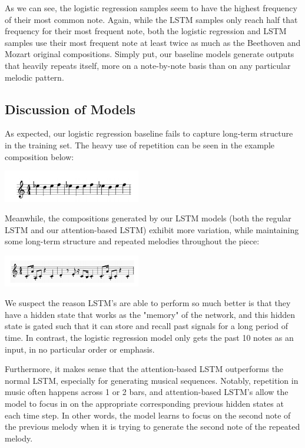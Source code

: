 \documentclass[twoside,twocolumn]{article}
\begin{document}
As we can see, the logistic regression samples seem to have the highest frequency of their most common note. Again, while the LSTM samples only reach half that frequency for their most frequent note, both the logistic regression and LSTM samples use their most frequent note at least twice as much as the Beethoven and Mozart original compositions. Simply put, our baseline models generate outputs that heavily repeats itself, more on a note-by-note basis than on any particular melodic pattern.

\subsection{Discussion of Models}

As expected, our logistic regression baseline fails to capture long-term
structure in the training set. The heavy use of repetition can be seen in the example composition below:

\includegraphics[width = 0.45\textwidth]{images/logreg_composition.png}

Meanwhile, the compositions generated by our LSTM models (both the regular LSTM and our attention-based LSTM) exhibit more
variation, while maintaining some long-term structure and repeated
melodies throughout the piece:

\includegraphics[width = 0.45\textwidth]{images/magenta_composition.png}

We suspect the reason LSTM's are able to perform so much better is that they have a hidden state that works as the "memory" of the network, and this hidden state is gated such that it can store and recall past signals for a long period of time. In contrast, the logistic regression model only gets the past 10 notes as an input, in no particular order or emphasis.

Furthermore, it makes sense that the attention-based LSTM outperforms the normal LSTM, especially for generating musical sequences. Notably, repetition in music often happens across 1 or 2 bars, and attention-based LSTM's allow the model to focus in on the appropriate corresponding previous hidden states at each time step. In other words, the model learns to focus on the second note of the previous melody when it is trying to generate the second note of the repeated melody. 
\end{document}
